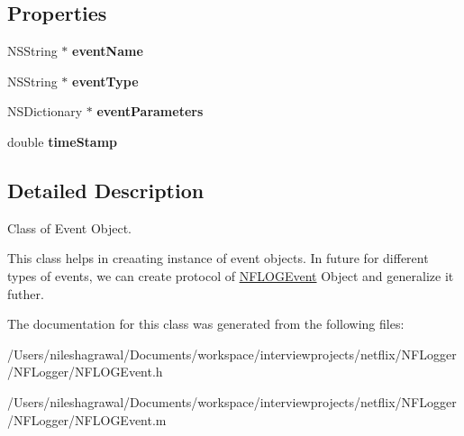 \subsection*{Properties}
\begin{DoxyCompactItemize}
\item 
\mbox{\label{interface_n_f_l_o_g_event_afa8e79c60a04ed4fbd8d7e95995e1d2d}} 
N\+S\+String $\ast$ {\bfseries event\+Name}
\item 
\mbox{\label{interface_n_f_l_o_g_event_a58db67718b5a8905f1fb3bd3f04bf4e3}} 
N\+S\+String $\ast$ {\bfseries event\+Type}
\item 
\mbox{\label{interface_n_f_l_o_g_event_add7d9bb77492d6d254d6e731d9e6ed8b}} 
N\+S\+Dictionary $\ast$ {\bfseries event\+Parameters}
\item 
\mbox{\label{interface_n_f_l_o_g_event_a79368262e03e155887422a6ca470dcdb}} 
double {\bfseries time\+Stamp}
\end{DoxyCompactItemize}


\subsection{Detailed Description}
Class of Event Object. 

This class helps in creaating instance of event objects. In future for different types of events, we can create protocol of \hyperlink{interface_n_f_l_o_g_event}{N\+F\+L\+O\+G\+Event} Object and generalize it futher. 

The documentation for this class was generated from the following files\+:\begin{DoxyCompactItemize}
\item 
/\+Users/nileshagrawal/\+Documents/workspace/interviewprojects/netflix/\+N\+F\+Logger/\+N\+F\+Logger/N\+F\+L\+O\+G\+Event.\+h\item 
/\+Users/nileshagrawal/\+Documents/workspace/interviewprojects/netflix/\+N\+F\+Logger/\+N\+F\+Logger/N\+F\+L\+O\+G\+Event.\+m\end{DoxyCompactItemize}

